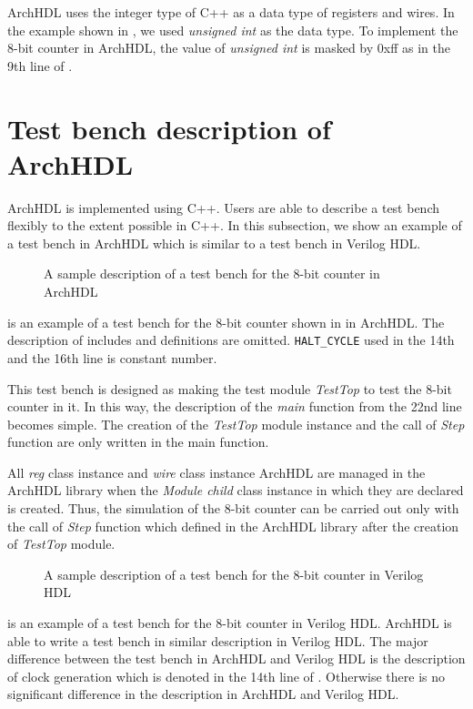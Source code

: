ArchHDL uses the integer type of C++ as a data type of registers and wires.
In the example shown in , we used \textit{unsigned int} as the data type.
To implement the 8-bit counter in ArchHDL, the value of \textit{unsigned int} is masked by 0xff as in the 9th line of .

\section{Test bench description of ArchHDL}

ArchHDL is implemented using C++.
Users are able to describe a test bench flexibly to the extent possible in C++.
In this subsection, we show an example of a test bench in ArchHDL which is similar to a test bench in Verilog HDL.

\begin{figure}[t]
 
 \caption{A sample description of a test bench for the 8-bit counter in ArchHDL}
 \label{src:test}
\end{figure}

 is an example of a test bench for the 8-bit counter shown in  in ArchHDL.
The description of includes and definitions are omitted.
\texttt{HALT\_CYCLE} used in the 14th and the 16th line is constant number.

This test bench is designed as making the test module \textit{TestTop} to test the 8-bit counter in it.
In this way, the description of the \textit{main} function from the 22nd line becomes simple.
The creation of the \textit{TestTop} module instance and the call of \textit{Step} function are only written in the main function.

All \textit{reg} class instance and \textit{wire} class instance ArchHDL are managed in the ArchHDL library when the \textit{Module child} class instance in which they are declared is created.
Thus, the simulation of the 8-bit counter can be carried out only with the call of \textit{Step} function which defined in the ArchHDL library after the creation of \textit{TestTop} module.

\begin{figure}[t]
 
 \caption{A sample description of a test bench for the 8-bit counter in Verilog HDL}
 \label{src:test_v}
\end{figure}

 is an example of a test bench for the 8-bit counter in Verilog HDL.
ArchHDL is able to write a test bench in similar description in Verilog HDL.
The major difference between the test bench in ArchHDL and Verilog HDL is the description of clock generation which is denoted in the 14th line of .
Otherwise there is no significant difference in the description in ArchHDL and Verilog HDL.


